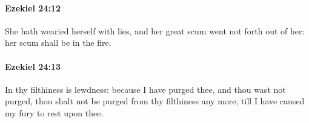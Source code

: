 		\paragraph{Ezekiel 24:12} %
			\label{EZEKIEL-24-12}

			She hath wearied herself with lies, and her great scum went not forth out of her: her scum shall be in the fire.


		\paragraph{Ezekiel 24:13} %
			\label{EZEKIEL-24-13}

			In thy filthiness is lewdness: because I have purged thee, and thou wast not purged, thou shalt not be purged from thy filthiness any more, till I have caused my fury to rest upon thee.


